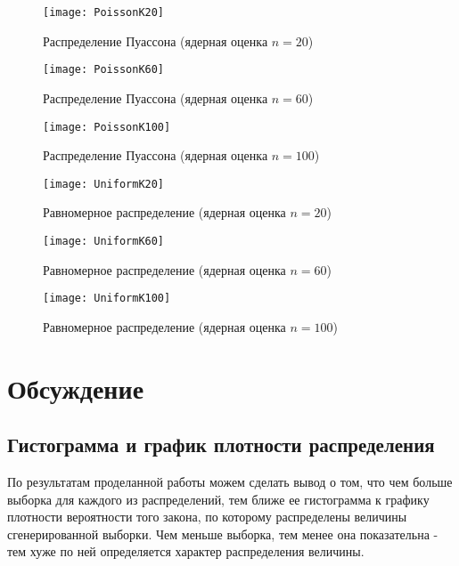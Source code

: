 \documentclass[a4paper]{article}
\begin{document}
\begin{figure}[H]
	\centering
	\texttt{[image: PoissonK20]}
	\caption{Распределение Пуассона (ядерная оценка $n=20$)} 
	\label{fig:poissonKDE20}
\end{figure}

\begin{figure}[H]
	\centering
	\texttt{[image: PoissonK60]}
	\caption{Распределение Пуассона (ядерная оценка $n=60$)} 
	\label{fig:poissonKDE60}
\end{figure}

\begin{figure}[H]
	\centering
	\texttt{[image: PoissonK100]}
	\caption{Распределение Пуассона (ядерная оценка $n=100$)} 
	\label{fig:poissonKDE100}
\end{figure}

\begin{figure}[H]
	\centering
	\texttt{[image: UniformK20]}
	\caption{Равномерное распределение (ядерная оценка $n=20$)} 
	\label{fig:uniKDE20}
\end{figure}

\begin{figure}[H]
	\centering
	\texttt{[image: UniformK60]}
	\caption{Равномерное распределение (ядерная оценка $n=60$)} 
	\label{fig:uniKDE60}
\end{figure}

\begin{figure}[H]
	\centering
	\texttt{[image: UniformK100]}
	\caption{Равномерное распределение (ядерная оценка $n=100$)} 
	\label{fig:uniKDE100}
\end{figure}


\section{Обсуждение}

\subsection{Гистограмма и график плотности распределения}

\noindent По результатам проделанной работы можем сделать вывод о том, что чем больше выборка для каждого из распределений, тем ближе ее гистограмма к графику плотности вероятности того закона, по которому распределены величины сгенерированной выборки. Чем меньше выборка, тем менее она показательна - тем хуже по ней определяется характер распределения величины.\\\
\end{document}
